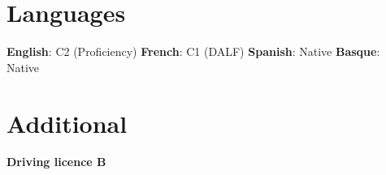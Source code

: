 \documentclass[letterpaper,11pt]{article}
\begin{document}

\section{Languages}
    \textbf{English}{: C2 (Proficiency)}
    \hfill\textbf{French}{: C1 (DALF)}
    \hfill\textbf{Spanish}{: Native}
    \hfill\textbf{Basque}{: Native}

\section{Additional}
    \textbf{Driving licence B}


\end{document}
